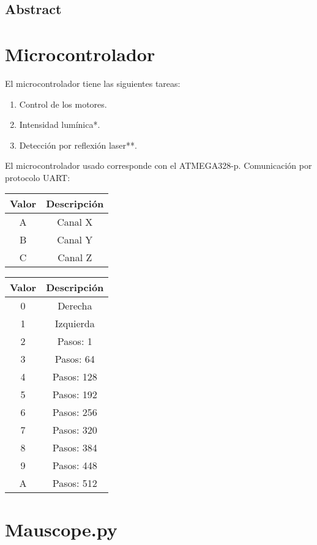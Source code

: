\documentclass{wileysix}
\begin{document}
\subtitle{Microscop\'ia Moderna}

\halftitlepage
\titlepage



\tableofcontents
\section{Abstract}
\chapter{Microcontrolador}
El microcontrolador tiene las siguientes tareas: 
\begin{enumerate}
	\item Control de los motores.
	\item Intensidad lumínica*.
	\item Detección por reflexión laser**.
\end{enumerate}

El microcontrolador usado corresponde con el ATMEGA328-p.
Comunicaci\'on por protocolo UART:
\begin{table}[h]
	\centering
	\begin{tabular}{cc}
		\hline
		\textbf{Valor} & \textbf{Descripción}\\
		\hline
		A & Canal X \\
		B & Canal Y \\
		C & Canal Z \\
		\hline
	\end{tabular}
\end{table}

\begin{table}[h]
	\centering
	\begin{tabular}{cc}
		\hline
		\textbf{Valor} & \textbf{Descripción}\\
		\hline
		0 & Derecha \\
		1 & Izquierda \\
		2 & Pasos: 1 \\
		3 & Pasos: 64 \\
		4 & Pasos: 128 \\
		5 & Pasos: 192 \\
		6 & Pasos: 256 \\
		7 & Pasos: 320 \\
		8 & Pasos: 384 \\
		9 & Pasos: 448 \\
		A & Pasos: 512 \\
		\hline
	\end{tabular}
\end{table}

\chapter{Mauscope.py}
\end{document}
